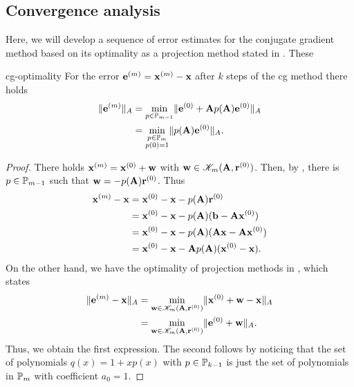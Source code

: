 \subsection{Convergence analysis}

\begin{intro}
  Here, we will develop a sequence of error estimates for the
  conjugate gradient method based on its optimality as a projection
  method stated in . These
\end{intro}

\begin{Theorem}{cg-optimality}
  For the error $\ve^{(m)} = \vx^{(m)}-\vx$ after $k$ steps of the cg
  method there holds
  \begin{align}
    \norm{\ve^{(m)}}_A
    & = \min_{p\in \P_{m-1}}
      \norm{\ve^{(0)} + \mata p(\mata) \ve^{(0)}}_A\\
    &= \min_{\substack{p\in\P_m\\p(0) = 1}} \norm{p(\mata)\ve^{(0)}}_A.
  \end{align}
\end{Theorem}

\begin{proof}
  There holds $\vx^{(m)} = \vx^{(0)} + \vw$ with
  $\vw \in \krylov_m(\mata,\vr^{(0)})$. Then, by
  , there is $p\in\P_{m-1}$ such
  that $\vw = -p(\mata) \vr^{(0)}$. Thus
  \begin{align}
    \vx^{(m)} - \vx
    &= \vx^{(0)} - \vx - p(\mata)\vr^{(0)}\\
    &= \vx^{(0)} - \vx - p(\mata) (\vb-\mata\vx^{(0)})\\
    &= \vx^{(0)} - \vx - p(\mata) (\mata\vx-\mata\vx^{(0)})\\
    &= \vx^{(0)} - \vx - \mata p(\mata) (\vx^{(0)}-\vx).
  \end{align}
  On the other hand, we have the optimality of projection methods in
  , which states
  \begin{align}
    \norm{\ve^{(m)} -\vx}_A
    &= \min_{\vw\in \krylov_m(\mata,\vr^{(0)})} \norm{\vx^{(0)}+\vw-\vx}_A\\
    &= \min_{\vw\in \krylov_m(\mata,\vr^{(0)})} \norm{\ve^{(0)}+\vw}_A.
  \end{align}
  Thus, we obtain the first expression. The second follows by noticing
  that the set of polynomials $q(x) = 1+xp(x)$ with $p\in\P_{k-1}$ is
  just the set of polynomials in $\P_m$ with coefficient $a_0 = 1$.
\end{proof}

